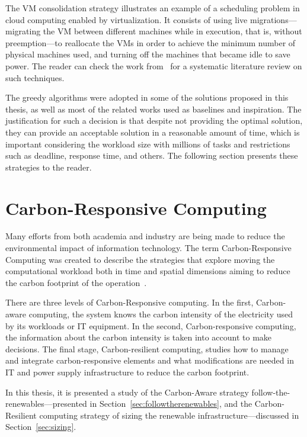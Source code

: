 The VM consolidation strategy illustrates an example of a scheduling problem in cloud computing enabled by virtualization. It consists of using live migrations---migrating the VM between different machines while in execution, that is, without preemption---to reallocate the VMs in order to achieve the minimum number of physical machines used, and turning off the machines that became idle to save power. The reader can check the work from~\citet{10.1145/3470972} for a systematic literature review on such techniques.


The greedy algorithms were adopted in some of the solutions proposed in this thesis, as well as most of the related works used as baselines and inspiration. The justification for such a decision is that despite not providing the optimal solution, they can provide an acceptable solution in a reasonable amount of time, which is important considering the workload size with millions of tasks and restrictions such as deadline, response time, and others. The following section presents these strategies to the reader.




\section{Carbon-Responsive Computing}

\label{sec:carbon_responsive}

Many efforts from both academia and industry are being made to reduce the environmental impact of information technology. The term Carbon-Responsive Computing was created to describe the strategies that explore moving the computational workload both in time and spatial dimensions aiming to reduce the carbon footprint of the operation~\cite{schooler2021carbonaware}.


There are three levels of Carbon-Responsive computing. In the first, Carbon-aware computing, the system knows the carbon intensity of the electricity used by its workloads or IT equipment. In the second, Carbon-responsive computing, the information about the carbon intensity is taken into account to make decisions. The final stage, Carbon-resilient computing, studies how to manage and integrate carbon-responsive elements and what modifications are needed in IT and power supply infrastructure to reduce the carbon footprint.

In this thesis, it is presented a study of the Carbon-Aware strategy follow-the-renewables---presented in Section~\ref{sec:followtherenewables}, and the Carbon-Resilient computing strategy of sizing the renewable infrastructure---discussed in Section~\ref{sec:sizing}.

